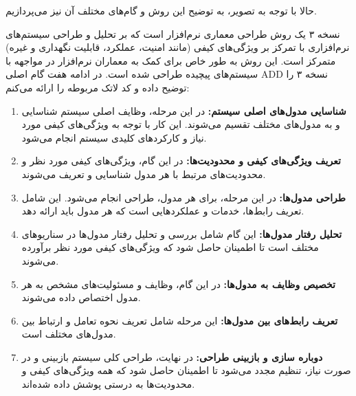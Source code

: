 حالا با توجه به تصویر، به توضیح این روش و گام‌های مختلف آن نیز می‌پردازیم.

 نسخه ۳ یک روش طراحی معماری نرم‌افزار است که بر تحلیل و طراحی سیستم‌های نرم‌افزاری با تمرکز بر ویژگی‌های کیفی (مانند امنیت، عملکرد، قابلیت نگهداری و غیره) متمرکز است. این روش به طور خاص برای کمک به معماران نرم‌افزار در مواجهه با سیستم‌های پیچیده طراحی شده است. در ادامه هفت گام اصلی ADD نسخه ۳ را توضیح داده و کد لاتک مربوطه را ارائه می‌کنم:

\begin{enumerate}
	\item \textbf{شناسایی مدول‌های اصلی سیستم:} در این مرحله، وظایف اصلی سیستم شناسایی و به مدول‌های مختلف تقسیم می‌شوند. این کار با توجه به ویژگی‌های کیفی مورد نیاز و کارکردهای کلیدی سیستم انجام می‌شود.
	\item \textbf{تعریف ویژگی‌های کیفی و محدودیت‌ها:} در این گام، ویژگی‌های کیفی مورد نظر و محدودیت‌های مرتبط با هر مدول شناسایی و تعریف می‌شوند.
	\item \textbf{طراحی مدول‌ها:} در این مرحله، برای هر مدول، طراحی انجام می‌شود. این شامل تعریف رابط‌ها، خدمات و عملکردهایی است که هر مدول باید ارائه دهد.
	\item \textbf{تحلیل رفتار مدول‌ها:} این گام شامل بررسی و تحلیل رفتار مدول‌ها در سناریوهای مختلف است تا اطمینان حاصل شود که ویژگی‌های کیفی مورد نظر برآورده می‌شوند.
	\item \textbf{تخصیص وظایف به مدول‌ها:} در این گام، وظایف و مسئولیت‌های مشخص به هر مدول اختصاص داده می‌شوند.
	\item \textbf{تعریف رابط‌های بین مدول‌ها:} این مرحله شامل تعریف نحوه تعامل و ارتباط بین مدول‌های مختلف است.
	\item \textbf{دوباره سازی و بازبینی طراحی:} در نهایت، طراحی کلی سیستم بازبینی و در صورت نیاز، تنظیم مجدد می‌شود تا اطمینان حاصل شود که همه ویژگی‌های کیفی و محدودیت‌ها به درستی پوشش داده شده‌اند.
\end{enumerate}